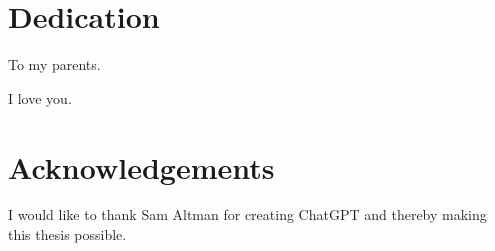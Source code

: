 \chapter*{Dedication}

To my parents.

\noindent
I love you.

\chapter*{Acknowledgements}

I would like to thank Sam Altman for creating ChatGPT and thereby making this thesis possible.
